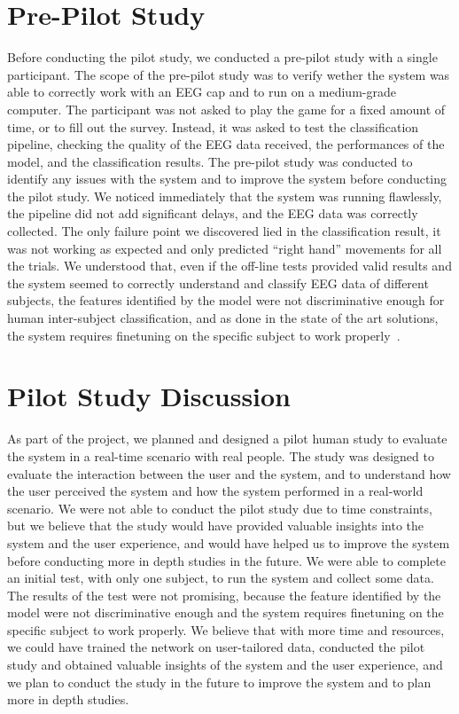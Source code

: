 \section{Pre-Pilot Study}
Before conducting the pilot study, we conducted a pre-pilot study with a single participant.
The scope of the pre-pilot study was to verify wether the system was able to correctly work with an EEG cap and to run on a medium-grade computer.
The participant was not asked to play the game for a fixed amount of time, or to fill out the survey.
Instead, it was asked to test the classification pipeline, checking the quality of the EEG data received, the performances of the model, and the classification results.
The pre-pilot study was conducted to identify any issues with the system and to improve the system before conducting the pilot study.
We noticed immediately that the system was running flawlessly, the pipeline did not add significant delays, and the EEG data was correctly collected.
The only failure point we discovered lied in the classification result, it was not working as expected and only predicted ``right hand'' movements for all the trials.
We understood that, even if the off-line tests provided valid results and the system seemed to correctly understand and classify EEG data of different subjects, the features identified by the model were not discriminative enough for human inter-subject classification, and as done in the state of the art solutions, the system requires finetuning on the specific subject to work properly~\cite{jia2023excellent}.

\section{Pilot Study Discussion}
As part of the project, we planned and designed a pilot human study to evaluate the system in a real-time scenario with real people.
The study was designed to evaluate the interaction between the user and the system, and to understand how the user perceived the system and how the system performed in a real-world scenario.
We were not able to conduct the pilot study due to time constraints, but we believe that the study would have provided valuable insights into the system and the user experience, and would have helped us to improve the system before conducting more in depth studies in the future.
We were able to complete an initial test, with only one subject, to run the system and collect some data.
The results of the test were not promising, because the feature identified by the model were not discriminative enough and the system requires finetuning on the specific subject to work properly.
We believe that with more time and resources, we could have trained the network on user-tailored data, conducted the pilot study and obtained valuable insights of the system and the user experience, and we plan to conduct the study in the future to improve the system and to plan more in depth studies.